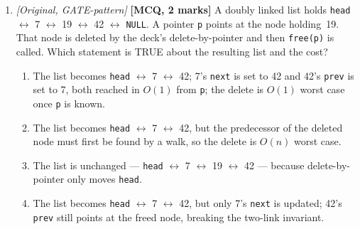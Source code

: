 \documentclass[11pt]{article}
\begin{document}
\begin{enumerate}
\item[\textbf{Q6}] \textit{[Original, GATE-pattern]} \textbf{[MCQ, 2 marks]} A doubly linked list holds \texttt{head} $\leftrightarrow$ 7 $\leftrightarrow$ 19 $\leftrightarrow$ 42 $\leftrightarrow$ \texttt{NULL}. A pointer \texttt{p} points at the node holding~19. That node is deleted by the deck's delete-by-pointer and then \texttt{free(p)} is called. Which statement is TRUE about the resulting list and the cost?
\begin{enumerate}
  \item[(A)] The list becomes \texttt{head} $\leftrightarrow$ 7 $\leftrightarrow$ 42; 7's \texttt{next} is set to 42 and 42's \texttt{prev} is set to 7, both reached in $O(1)$ from \texttt{p}; the delete is $O(1)$ worst case once \texttt{p} is known.
  \item[(B)] The list becomes \texttt{head} $\leftrightarrow$ 7 $\leftrightarrow$ 42, but the predecessor of the deleted node must first be found by a walk, so the delete is $O(n)$ worst case.
  \item[(C)] The list is unchanged --- \texttt{head} $\leftrightarrow$ 7 $\leftrightarrow$ 19 $\leftrightarrow$ 42 --- because delete-by-pointer only moves \texttt{head}.
  \item[(D)] The list becomes \texttt{head} $\leftrightarrow$ 7 $\leftrightarrow$ 42, but only 7's \texttt{next} is updated; 42's \texttt{prev} still points at the freed node, breaking the two-link invariant.
\end{enumerate}


\end{enumerate}
\end{document}
